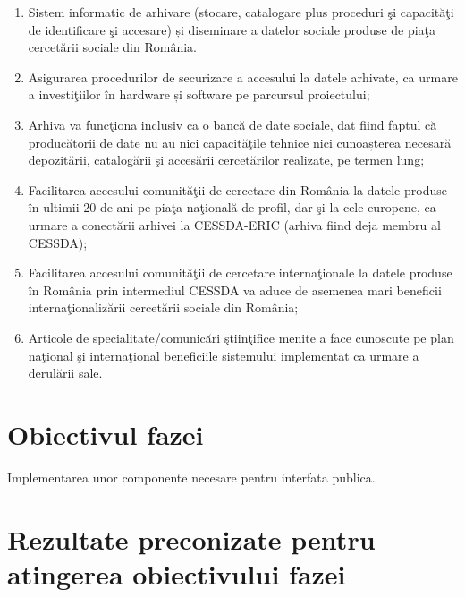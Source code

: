 \documentclass[a4paper, 10pt]{article}
\begin{document}
\begin{enumerate}
\item {
Sistem informatic de arhivare (stocare, catalogare plus proceduri \c{s}i capacit\u{a}\c{t}i de identificare \c{s}i
accesare) \foreignlanguage{romanian}{\c{s}}i diseminare a datelor sociale produse de pia\c{t}a cercet\u{a}rii sociale
din Rom\^ania.}
\item {
Asigurarea procedurilor de securizare a accesului la datele arhivate, ca urmare a investi\c{t}iilor \^in hardware
\foreignlanguage{romanian}{\c{s}}i software pe parcursul proiectului;}
\item {
\foreignlanguage{romanian}{Arhiva }va func\c{t}iona inclusiv ca o banc\u{a} de date sociale, dat fiind faptul c\u{a}
produc\u{a}torii de date nu au nici capacit\u{a}\c{t}ile tehnice nici \foreignlanguage{romanian}{cunoa\c{s}terea}
necesar\u{a} depozit\u{a}rii, catalog\u{a}rii \c{s}i acces\u{a}rii cercet\u{a}rilor realizate, pe termen lung;}
\item {
Facilitarea accesului comunit\u{a}\c{t}ii de cercetare din Rom\^ania la datele produse \^in ultimii 20 de ani pe
pia\c{t}a na\c{t}ional\u{a} de profil, dar \c{s}i la cele europene, ca urmare a conect\u{a}rii arhivei la CESSDA-ERIC
(arhiva fiind deja membru al CESSDA);}
\item {
Facilitarea accesului comunit\u{a}\c{t}ii de cercetare interna\c{t}ionale la datele produse \^in Rom\^ania prin
intermediul CESSDA va aduce de asemenea mari beneficii interna\c{t}ionaliz\u{a}rii cercet\u{a}rii sociale din
Rom\^ania;}
\item {
Articole de specialitate/comunic\u{a}ri \c{s}tiin\c{t}ifice menite a face cunoscute pe plan na\c{t}ional \c{s}i
interna\c{t}ional beneficiile sistemului implementat ca urmare a derul\u{a}rii sale.}
\end{enumerate}

\section{Obiectivul fazei}


Implementarea unor componente necesare pentru interfata publica.

\section{Rezultate preconizate pentru atingerea obiectivului fazei}
\end{document}
